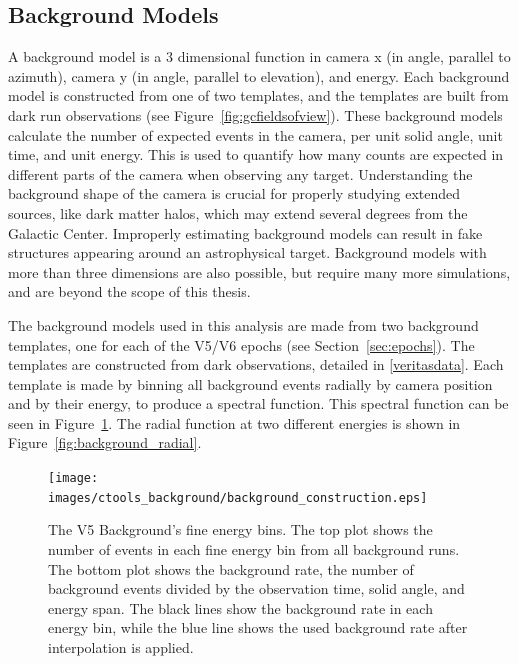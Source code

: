   \FloatBarrier
  
  \subsection{Background Models}\label{background_production}
  
    A background model is a 3 dimensional function in camera x (in angle, parallel to azimuth), camera y (in angle, parallel to elevation), and energy.
    Each background model is constructed from one of two templates, and the templates are built from dark run observations (see Figure~\ref{fig:gcfieldsofview}).
    These background models calculate the number of expected events in the camera, per unit solid angle, unit time, and unit energy.
    This is used to quantify how many counts are expected in different parts of the camera when observing any target.
    Understanding the background shape of the camera is crucial for properly studying extended sources, like dark matter halos, which may extend several degrees from the Galactic Center.
    Improperly estimating background models can result in fake structures appearing around an astrophysical target.
    Background models with more than three dimensions are also possible, but require many more simulations, and are beyond the scope of this thesis.
    
    The background models used in this analysis are made from two background templates, one for each of the V5/V6 epochs (see Section~\ref{sec:epochs}).
    The templates are constructed from dark observations, detailed in \ref{veritasdata}.
    Each template is made by binning all background events radially by camera position and by their energy, to produce a spectral function.
    This spectral function can be seen in Figure~\ref{fig:background_profile}.
    The radial function at two different energies is shown in Figure~\ref{fig:background_radial}.

    \begin{figure}[ht]
      \centering
      \texttt{[image: images/ctools\_background/background\_construction.eps]}
      \caption[CTOOLS Background Fine Energy Bins]{
        The V5 Background's fine energy bins.
        The top plot shows the number of events in each fine energy bin from all background runs.
        The bottom plot shows the background rate, the number of background events divided by the observation time, solid angle, and energy span.
        The black lines show the background rate in each energy bin, while the blue line shows the used background rate after interpolation is applied.
      }
      \label{fig:background_profile}
    \end{figure}

